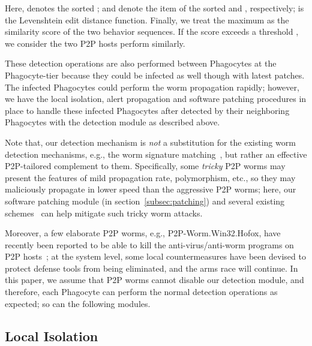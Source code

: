 \documentclass[times,10pt,twocolumn]{article}
\begin{document}
\noindent Here,  denotes the sorted ;
 and  denote the 
item of the sorted  and , respectively;  is the
Levenshtein edit distance function. Finally, we treat the maximum
 as the similarity score of the two
behavior sequences. If the score exceeds a threshold , we
consider the two P2P hosts perform similarly.



These detection operations are also performed between Phagocytes at
the Phagocyte-tier because they could be infected as well though
with latest patches. The infected Phagocytes could perform the worm
propagation rapidly; however, we have the local isolation, alert
propagation and software patching procedures in place to handle
these infected Phagocytes after detected by their neighboring
Phagocytes with the detection module as described above.




Note that, our detection mechanism is \emph{not} a substitution for
the existing worm detection mechanisms, e.g., the worm signature
matching~\cite{BrumleyNSWJ06}, but rather an effective P2P-tailored
complement to them. Specifically, some \emph{tricky} P2P worms may
present the features of mild propagation rate, polymorphism, etc.,
so they may maliciously propagate in lower speed than the aggressive
P2P worms; here, our software patching module (in
section~\ref{subsec:patching}) and several existing
schemes~\cite{1095824,WangGSZ04} can help mitigate such tricky worm
attacks.




Moreover, a few elaborate P2P worms, e.g., P2P-Worm.Win32.Hofox,
have recently been reported to be able to kill the
anti-virus/anti-worm programs on P2P hosts~\cite{p2p-worm-website};
at the system level, some local countermeasures have been devised to
protect defense tools from being eliminated, and the arms race will
continue. In this paper, we assume that P2P worms cannot disable our
detection module, and therefore, each Phagocyte can perform the
normal detection operations as expected; so can the following
modules.




\subsection{Local Isolation}
\end{document}
